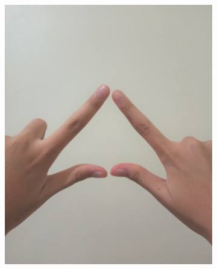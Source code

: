\documentclass[conference]{IEEEtran}
\begin{document}
\begin{figure} [h]
\begin{center}
\begin{subfigure}[t]{0.11\textwidth}
			\includegraphics[width=\textwidth]{img/pola7.jpg}
			\caption{\label{fig:gs7}}
		\end{subfigure}
		\hspace{0.1em}
		\begin{subfigure}[t]{0.11\textwidth}
			\centering

\end{subfigure}
\end{center}
\end{figure}
\end{document}

